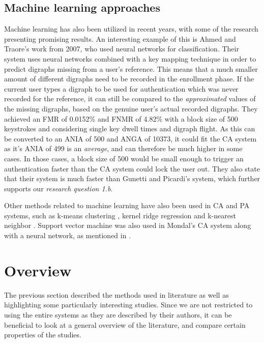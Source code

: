 \documentclass[informationsecurity]{gucmasterproject}
\begin{document}
\subsection{Machine learning approaches}
Machine learning has also been utilized in recent years, with some of the research presenting promising results.
An interesting example of this is Ahmed and Traore's \cite{Ahmed} work from 2007, who used neural networks for classification.
Their system uses neural networks combined with a key mapping technique in order to predict digraphs missing from a user's reference.
This means that a much smaller amount of different digraphs need to be recorded in the enrollment phase.
If the current user types a digraph to be used for authentication which was never recorded for the reference, it can still be compared to the \textit{approximated} values of the missing digraphs, based on the genuine user's actual recorded digraphs.
They achieved an FMR of 0.0152\% and FNMR of 4.82\% with a block size of 500 keystrokes and considering single key dwell times and digraph flight.
As this can be converted to an ANIA of 500 and ANGA of 10373, it could fit the CA system as it's ANIA of 499 is an \textit{average}, and can therefore be much higher in some cases.
In those cases, a block size of 500 would be small enough to trigger an authentication faster than the CA system could lock the user out.
They also state that their system is much faster than Gunetti and Picardi's system, which further supports our \textit{research question 1.b}.

Other methods related to machine learning have also been used in CA and PA systems, such as k-means clustering \cite{KIM2017, Solami}, kernel ridge regression \cite{900words} and k-nearest neighbor \cite{hu, monaco}.
Support vector machine was also used in Mondal's \cite{mondal} CA system along with a neural network, as mentioned in .



\section{Overview}
\label{sec:related-overview}
The previous section described the methods used in literature as well as highlighting some particularly interesting studies.
Since we are not restricted to using the entire systems as they are described by their authors, it can be beneficial to look at a general overview of the literature, and compare certain properties of the studies.
\end{document}

